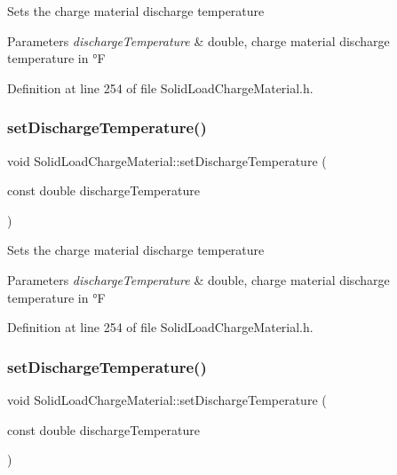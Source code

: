 Sets the charge material discharge temperature 
\begin{DoxyParams}{Parameters}
{\em discharge\+Temperature} & double, charge material discharge temperature in °F \\
\hline
\end{DoxyParams}


Definition at line 254 of file Solid\+Load\+Charge\+Material.\+h.

\mbox{\label{class_solid_load_charge_material_adf73bc8d656a501cae5ad68af7a7c4fb}} 
\subsubsection{\texorpdfstring{set\+Discharge\+Temperature()}{setDischargeTemperature()}\hspace{0.1cm}{\footnotesize\ttfamily [2/3]}}
{\footnotesize\ttfamily void Solid\+Load\+Charge\+Material\+::set\+Discharge\+Temperature (\begin{DoxyParamCaption}\item[{const double}]{discharge\+Temperature }\end{DoxyParamCaption})\hspace{0.3cm}{\ttfamily [inline]}}

Sets the charge material discharge temperature 
\begin{DoxyParams}{Parameters}
{\em discharge\+Temperature} & double, charge material discharge temperature in °F \\
\hline
\end{DoxyParams}


Definition at line 254 of file Solid\+Load\+Charge\+Material.\+h.

\mbox{\label{class_solid_load_charge_material_adf73bc8d656a501cae5ad68af7a7c4fb}} 
\subsubsection{\texorpdfstring{set\+Discharge\+Temperature()}{setDischargeTemperature()}\hspace{0.1cm}{\footnotesize\ttfamily [3/3]}}
{\footnotesize\ttfamily void Solid\+Load\+Charge\+Material\+::set\+Discharge\+Temperature (\begin{DoxyParamCaption}\item[{const double}]{discharge\+Temperature }\end{DoxyParamCaption})\hspace{0.3cm}{\ttfamily [inline]}}

